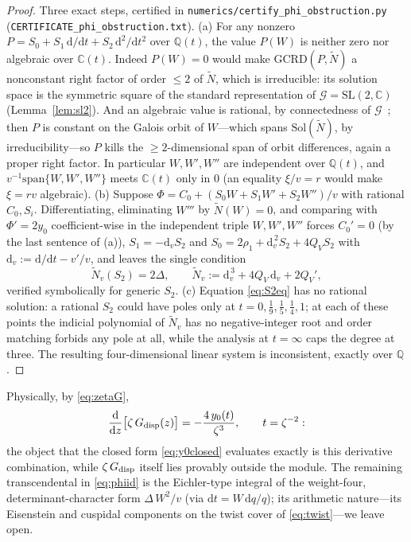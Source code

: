 \documentclass[11pt]{article}
\newcommand{\rmd}{\mathrm{d}}
\theoremstyle{plain}
\theoremstyle{remark}
\begin{document}
\begin{proof}
Three exact steps, certified in
\texttt{numerics/\allowbreak certify\_\allowbreak phi\_\allowbreak obstruction.py}
(\texttt{CERTIFICATE\_\allowbreak phi\_\allowbreak obstruction.txt}). (a) For any nonzero $P=S_0+S_1\,\rmd/\rmd t+S_2\,
\rmd^2/\rmd t^2$ over $\mathbb{Q}(t)$, the value $P(W)$ is neither zero nor algebraic over
$\mathbb{C}(t)$. Indeed $P(W)=0$ would make $\mathrm{GCRD}(P,\widetilde N)$ a nonconstant right
factor of order ${\le}2$ of $\widetilde N$, which is irreducible: its solution space is the
symmetric square of the standard representation of $\mathcal{G}=\mathrm{SL}(2,\mathbb{C})$
(Lemma~\ref{lem:sl2}). And an algebraic value is rational, by connectedness of
$\mathcal{G}$~\cite{vdPutSinger}; then $P$ is constant on the Galois orbit of $W$---which spans
$\mathrm{Sol}(\widetilde N)$, by irreducibility---so $P$ kills the ${\ge}2$-dimensional span of
orbit differences, again a proper right factor. In particular $W,W',W''$ are independent over
$\mathbb{Q}(t)$, and $v^{-1}\mathrm{span}\{W,W',W''\}$ meets $\mathbb{C}(t)$ only in $0$ (an
equality $\xi/v=r$ would make $\xi=rv$ algebraic). (b) Suppose
$\Phi=C_0+(S_0W+S_1W'+S_2W'')/v$ with rational $C_0,S_i$. Differentiating, eliminating $W'''$ by
$\widetilde N(W)=0$, and comparing with $\Phi'=2y_0$ coefficient-wise in the independent triple
$W,W',W''$ forces $C_0'=0$ (by the last sentence of (a)), $S_1=-\rmd_vS_2$ and
$S_0=2\rho_1+\rmd_v^{\,2}S_2+4Q_VS_2$ with $\rmd_v:=\rmd/\rmd t-v'/v$, and leaves the single
condition
\begin{equation}
\widetilde N_v(S_2)=2\Delta,\qquad
\widetilde N_v:=\rmd_v^{\,3}+4Q_V\,\rmd_v+2Q_V',
\label{eq:S2eq}
\end{equation}
verified symbolically for generic $S_2$. (c) Equation \eqref{eq:S2eq} has no rational solution: a
rational $S_2$ could have poles only at $t=0,\tfrac19,\tfrac15,\tfrac14,1$; at each of these points
the indicial polynomial of $\widetilde N_v$ has no negative-integer root and order matching forbids
any pole at all, while the analysis at $t=\infty$ caps the degree at three. The resulting
four-dimensional linear system is inconsistent, exactly over $\mathbb{Q}$.
\end{proof}

Physically, by \eqref{eq:zetaG},
\begin{equation}
\frac{\rmd}{\rmd z}\big[\zeta\,G_{\rm disp}(z)\big]=-\frac{4\,y_0(t)}{\zeta^{3}},\qquad
t=\zeta^{-2}:
\label{eq:dzG}
\end{equation}
the object that the closed form \eqref{eq:y0closed} evaluates exactly is this derivative combination,
while $\zeta\,G_{\rm disp}$ itself lies provably outside the module. The remaining transcendental
in \eqref{eq:phiid} is the Eichler-type integral of the weight-four, determinant-character form
$\Delta\,W^2/v$ (via $\rmd t=W\,\rmd q/q$); its arithmetic nature---its Eisenstein and cuspidal
components on the twist cover of \eqref{eq:twist}---we leave open.
\end{document}
